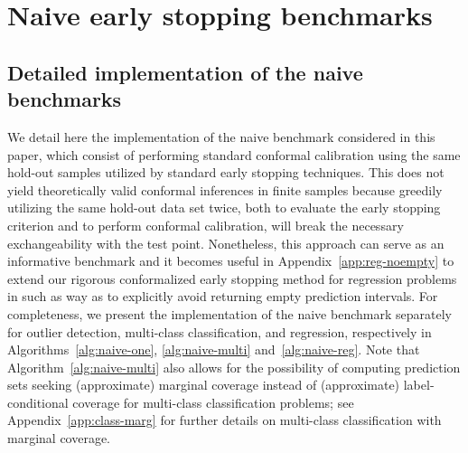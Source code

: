 \appendix
\renewcommand{\thesection}{A\arabic{section}}
\renewcommand{\theequation}{A\arabic{equation}}
\renewcommand{\thetheorem}{A\arabic{theorem}}
\renewcommand{\thecorollary}{A\arabic{corollary}}
\renewcommand{\theproposition}{A\arabic{proposition}}
\renewcommand{\thelemma}{A\arabic{lemma}}
\renewcommand{\thetable}{A\arabic{table}}
\renewcommand{\thefigure}{A\arabic{figure}}
\renewcommand{\thealgorithm}{A\arabic{algorithm}}





\section{Naive early stopping benchmarks} \label{app:naive-benchmarks}

\subsection{Detailed implementation of the naive benchmarks}  \label{app:naive-benchmarks-details}

We detail here the implementation of the naive benchmark considered in this paper, which consist of performing standard conformal calibration using the same hold-out samples utilized by standard early stopping techniques.
This does not yield theoretically valid conformal inferences in finite samples because greedily utilizing the same hold-out data set twice, both to evaluate the early stopping criterion and to perform conformal calibration, will break the necessary exchangeability with the test point. Nonetheless, this approach can serve as an informative benchmark and it becomes useful in Appendix~\ref{app:reg-noempty} to extend our rigorous conformalized early stopping method for regression problems in such as way as to explicitly avoid returning empty prediction intervals.
For completeness, we present the implementation of the naive benchmark separately for outlier detection, multi-class classification, and regression, respectively in Algorithms~\ref{alg:naive-one}, \ref{alg:naive-multi} and~\ref{alg:naive-reg}.
Note that Algorithm~\ref{alg:naive-multi} also allows for the possibility of computing prediction sets seeking (approximate) marginal coverage instead of (approximate) label-conditional coverage for multi-class classification problems; see Appendix~\ref{app:class-marg} for further details on multi-class classification with marginal coverage.

